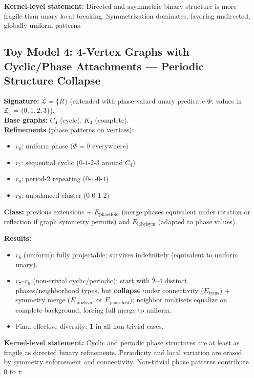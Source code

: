 \documentclass[11pt,a4paper]{article}
\theoremstyle{definition}
\theoremstyle{remark}
\begin{document}
\textbf{Kernel-level statement:} Directed and asymmetric binary structure is more fragile than unary local breaking. Symmetrization dominates, favoring undirected, globally uniform patterns.

\subsection{Toy Model 4: 4-Vertex Graphs with Cyclic/Phase Attachments --- Periodic Structure Collapse}

\textbf{Signature:} $\mathcal{L}=\{R\}$ (extended with phase-valued unary predicate $\Phi$: values in $\mathbb{Z}_4 = \{0,1,2,3\}$).\\
\textbf{Base graphs:} $C_4$ (cycle), $K_4$ (complete).\\
\textbf{Refinements} (phase patterns on vertices):
\begin{itemize}[nosep]
  \item $r_6$: uniform phase ($\Phi=0$ everywhere)
  \item $r_7$: sequential cyclic ($0$-$1$-$2$-$3$ around $C_4$)
  \item $r_8$: period-2 repeating ($0$-$1$-$0$-$1$)
  \item $r_9$: unbalanced cluster ($0$-$0$-$1$-$2$)
\end{itemize}

\textbf{Class:} previous extensions + $E_{\mathrm{phasefold}}$ (merge phases equivalent under rotation or reflection if graph symmetry permits) and $E_{\mathrm{labelsym}}$ (adapted to phase values).

\textbf{Results:}
\begin{itemize}[nosep]
  \item $r_6$ (uniform): fully projectable; survives indefinitely (equivalent to uniform unary).
  \item $r_7$--$r_9$ (non-trivial cyclic/periodic): start with 2--4 distinct phases/neighborhood types, but \textbf{collapse} under connectivity ($E_{\mathrm{trans}}$) + symmetry merge ($E_{\mathrm{labelsym}}$ or $E_{\mathrm{phasefold}}$); neighbor multisets equalize on complete background, forcing full merge to uniform.
  \item Final effective diversity: \textbf{1} in all non-trivial cases.
\end{itemize}

\textbf{Kernel-level statement:} Cyclic and periodic phase structures are at least as fragile as directed binary refinements. Periodicity and local variation are erased by symmetry enforcement and connectivity. Non-trivial phase patterns contribute 0 to $\tau$.
\end{document}

